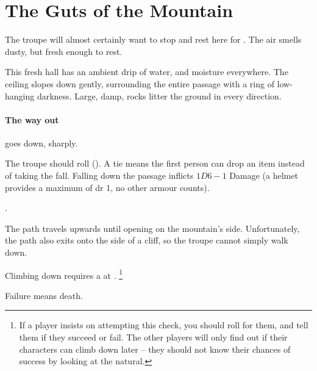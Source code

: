 \pagebreak[4]

\section{The Guts of the Mountain}

\begin{multicols}{2}


The troupe will almost certainly want to stop and rest here for .
The air smells dusty, but fresh enough to rest.

\begin{boxtext}
  This fresh hall has an ambient drip of water, and moisture everywhere.
  The ceiling slopes down gently, surrounding the entire passage with a ring of low-hanging darkness.
  Large, damp, rocks litter the ground in every direction.
\end{boxtext}

\paragraph{The way out}
goes down, sharply.

The troupe should roll  (\tn[10]).
A tie means the first person can drop an item instead of taking the fall.
Falling down the passage inflicts $1D6-1$ Damage (a helmet provides a maximum of \gls{dr} 1, no other armour counts).

.




The path travels upwards until opening on the mountain's side.
Unfortunately, the path also exits onto the side of a cliff, so the troupe cannot simply walk down.

Climbing down requires a  at \tn[14].%
\footnote{If a player insists on attempting this check, you should roll for them, and tell them if they succeed or fail.  The other players will only find out if their characters can climb down later -- they should not know their chances of success by looking at the \gls{natural}.}

Failure means death.



\end{multicols}
